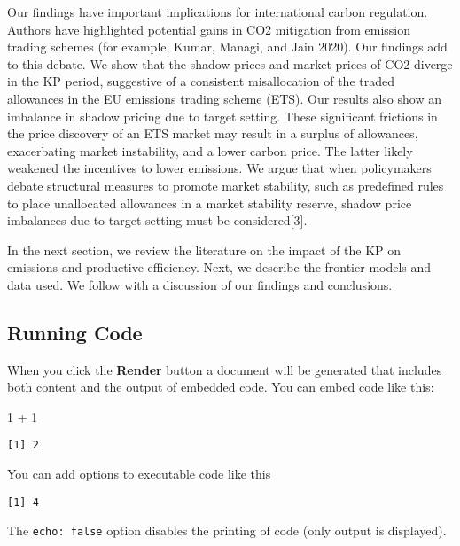 \documentclass[
  letterpaper,
  DIV=11,
  numbers=noendperiod]{scrartcl}
\newenvironment{Shaded}{\begin{snugshade}}{\end{snugshade}}
\newcommand{\DecValTok}[1]{\textcolor[rgb]{0.68,0.00,0.00}{#1}}
\newcommand{\SpecialCharTok}[1]{\textcolor[rgb]{0.37,0.37,0.37}{#1}}
\begin{document}
Our findings have important implications for international carbon
regulation. Authors have highlighted potential gains in CO2 mitigation
from emission trading schemes (for example, Kumar, Managi, and Jain
2020). Our findings add to this debate. We show that the shadow prices
and market prices of CO2 diverge in the KP period, suggestive of a
consistent misallocation of the traded allowances in the EU emissions
trading scheme (ETS). Our results also show an imbalance in shadow
pricing due to target setting. These significant frictions in the price
discovery of an ETS market may result in a surplus of allowances,
exacerbating market instability, and a lower carbon price. The latter
likely weakened the incentives to lower emissions. We argue that when
policymakers debate structural measures to promote market stability,
such as predefined rules to place unallocated allowances in a market
stability reserve, shadow price imbalances due to target setting must be
considered{[}3{]}.

In the next section, we review the literature on the impact of the KP on
emissions and productive efficiency. Next, we describe the frontier
models and data used. We follow with a discussion of our findings and
conclusions.

\hypertarget{running-code}{%
\subsection{Running Code}\label{running-code}}

When you click the \textbf{Render} button a document will be generated
that includes both content and the output of embedded code. You can
embed code like this:

\begin{Shaded}
\begin{Highlighting}[]
\DecValTok{1} \SpecialCharTok{+} \DecValTok{1}
\end{Highlighting}
\end{Shaded}

\begin{verbatim}
[1] 2
\end{verbatim}

You can add options to executable code like this

\begin{verbatim}
[1] 4
\end{verbatim}

The \texttt{echo:\ false} option disables the printing of code (only
output is displayed).
\end{document}
